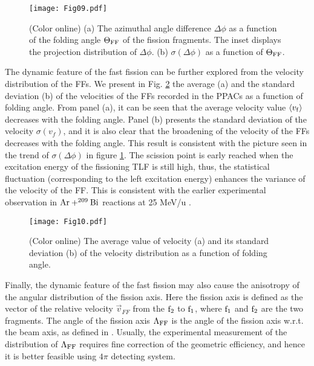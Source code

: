 \documentclass[submitting]{nst}
\begin{document}
\begin{figure}[!htb]
\texttt{[image: Fig09.pdf]}
\caption{(Color online) (a) The azimuthal angle difference $\Delta \phi$ as a function of the folding angle  $\Theta_{\rm FF}$ of the fission fragments. The inset displays the projection distribution of $\Delta \phi$. (b) $\sigma(\Delta \phi)$ as a function of $\Theta_{\rm FF}$.}
\label{d_phi}
\end{figure}

 The dynamic feature of the fast fission can be further explored from the velocity distribution of the FFs. We present in Fig. \ref{v_folding} the average (a) and the standard deviation (b) of the  velocities of the FFs recorded in the PPACs as a function of folding angle. From panel (a), it can be seen that the average velocity value $\left<v_{\rm f}\right>$  decreases with the folding angle.  Panel (b) presents the standard deviation of the velocity $\sigma(v_{f})$, and it is also clear that the broadening of the velocity of the FFs decreases with the folding angle.  This result is consistent with the picture seen in the trend of $\sigma(\Delta \phi)$ in figure \ref{d_phi}.   The scission point is early reached when the excitation energy of the fissioning TLF is still high, thus,  the statistical fluctuation (corresponding to the left excitation energy) enhances the variance of the velocity of the FF. This is consistent with the earlier experimental observation in ${\rm Ar+^{209}Bi}$  reactions at 25 MeV/u \cite{zjw1999,zjw1999-2}.

\begin{figure}[!htb]
\texttt{[image: Fig10.pdf]}
\caption{(Color online) The average value of velocity   (a) and its standard deviation (b) of the velocity distribution  as a function of  folding angle.}
\label{v_folding}
\end{figure}

Finally, the dynamic feature of the fast fission may also cause the anisotropy of the angular distribution of the fission axis. Here the fission axis is defined as the vector of the relative velocity $\vec{v}_{FF}$ from the $\rm f_2$ to $\rm f_1$, where  $\rm f_1$ and  $\rm f_2$ are the two fragments. The angle of the fission axis $\Lambda_{\rm FF}$ is the angle of the fission axis w.r.t. the beam axis, as defined in \cite{Wuqh2019}. Usually, the experimental measurement of the distribution of   $\Lambda_{\rm FF}$ requires fine correction of the geometric efficiency, and hence it is better feasible using $4\pi$ detecting system. 
\end{document}
